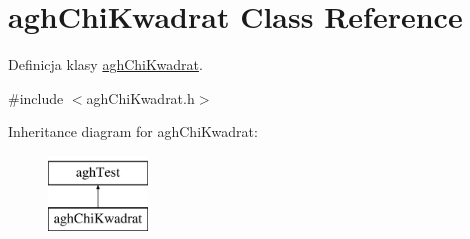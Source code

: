 \hypertarget{classaghChiKwadrat}{\section{agh\-Chi\-Kwadrat \-Class \-Reference}
\label{classaghChiKwadrat}
}


\-Definicja klasy \hyperlink{classaghChiKwadrat}{agh\-Chi\-Kwadrat}.  




{\ttfamily \#include $<$agh\-Chi\-Kwadrat.\-h$>$}

\-Inheritance diagram for agh\-Chi\-Kwadrat\-:\begin{figure}[H]
\begin{center}
\leavevmode
\includegraphics[height=2.000000cm]{classaghChiKwadrat}
\end{center}
\end{figure}
